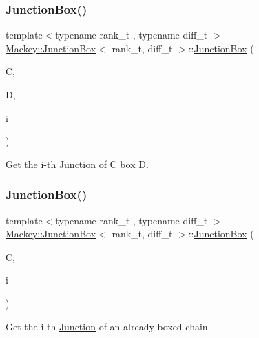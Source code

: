 \subsubsection{\texorpdfstring{Junction\+Box()}{JunctionBox()}\hspace{0.1cm}{\footnotesize\ttfamily [2/3]}}
{\footnotesize\ttfamily template$<$typename rank\+\_\+t , typename diff\+\_\+t $>$ \\
\hyperlink{classMackey_1_1JunctionBox}{Mackey\+::\+Junction\+Box}$<$ rank\+\_\+t, diff\+\_\+t $>$\+::\hyperlink{classMackey_1_1JunctionBox}{Junction\+Box} (\begin{DoxyParamCaption}\item[{const \hyperlink{classMackey_1_1Chains}{Chains}$<$ rank\+\_\+t, diff\+\_\+t $>$ \&}]{C,  }\item[{const \hyperlink{classMackey_1_1Chains}{Chains}$<$ rank\+\_\+t, diff\+\_\+t $>$ \&}]{D,  }\item[{int}]{i }\end{DoxyParamCaption})}



Get the i-\/th \hyperlink{classMackey_1_1Junction}{Junction} of C box D. 

\mbox{\label{classMackey_1_1JunctionBox_abd78f76fdc5f83906046e44c6901c54d}} 
\subsubsection{\texorpdfstring{Junction\+Box()}{JunctionBox()}\hspace{0.1cm}{\footnotesize\ttfamily [3/3]}}
{\footnotesize\ttfamily template$<$typename rank\+\_\+t , typename diff\+\_\+t $>$ \\
\hyperlink{classMackey_1_1JunctionBox}{Mackey\+::\+Junction\+Box}$<$ rank\+\_\+t, diff\+\_\+t $>$\+::\hyperlink{classMackey_1_1JunctionBox}{Junction\+Box} (\begin{DoxyParamCaption}\item[{const \hyperlink{classMackey_1_1ChainsBox}{Chains\+Box}$<$ rank\+\_\+t, diff\+\_\+t $>$ \&}]{C,  }\item[{int}]{i }\end{DoxyParamCaption})}



Get the i-\/th \hyperlink{classMackey_1_1Junction}{Junction} of an already boxed chain. 



